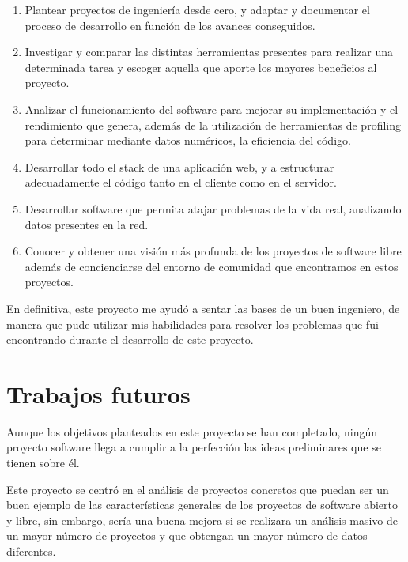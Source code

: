 \documentclass[a4paper, spanish, 12pt]{book}
\begin{document}
\begin{enumerate}
  \item Plantear proyectos de ingenier\'ia desde cero, y adaptar y documentar el proceso de
  desarrollo en funci\'on de los avances conseguidos.

  \item Investigar y comparar las distintas herramientas presentes para realizar
  una determinada tarea y escoger aquella que aporte los mayores beneficios al proyecto.

  \item Analizar el funcionamiento del software para mejorar su implementaci\'on y
  el rendimiento que genera, adem\'as de la utilizaci\'on de herramientas de profiling
  para determinar mediante datos num\'ericos, la eficiencia del c\'odigo.

  \item Desarrollar todo el stack de una aplicaci\'on web, y a estructurar adecuadamente
  el c\'odigo tanto en el cliente como en el servidor.

  \item Desarrollar software que permita atajar problemas de la vida real, analizando
  datos presentes en la red.

  \item Conocer y obtener una visi\'on m\'as profunda de los proyectos de software libre
  adem\'as de concienciarse del entorno de comunidad que encontramos en estos proyectos.
\end{enumerate}

En definitiva, este proyecto me ayud\'o a sentar las bases de un buen ingeniero, de manera que
pude utilizar mis habilidades para resolver los problemas que fui encontrando durante
el desarrollo de este proyecto.

\section{Trabajos futuros}
\label{sec:trabajos_futuros}

Aunque los objetivos planteados en este proyecto se han completado, ning\'un
proyecto software llega a cumplir a la perfecci\'on las ideas preliminares que se
tienen sobre \'el.

Este proyecto se centr\'o en el an\'alisis de proyectos concretos que puedan ser
un buen ejemplo de las caracter\'isticas generales de los proyectos de software abierto
y libre, sin embargo, ser\'ia una buena mejora si se realizara un an\'alisis masivo
de un mayor n\'umero de proyectos y que obtengan un mayor n\'umero de datos diferentes.
\end{document}
